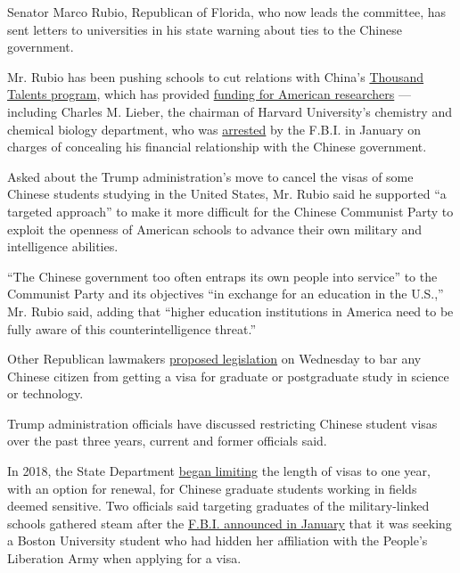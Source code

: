 Senator Marco Rubio, Republican of Florida, who now leads the committee,
has sent letters to universities in his state warning about ties to the
Chinese government.

Mr. Rubio has been pushing schools to cut relations with China's
\href{https://www.nytimes3xbfgragh.onion/2020/02/06/us/chinas-lavish-funds-lured-us-scientists-what-did-it-get-in-return.html}{Thousand
Talents program}, which has provided
\href{https://www.nytimes3xbfgragh.onion/2020/02/06/us/chinas-lavish-funds-lured-us-scientists-what-did-it-get-in-return.html}{funding
for American researchers} --- including Charles M. Lieber, the chairman
of Harvard University's chemistry and chemical biology department, who
was
\href{https://www.nytimes3xbfgragh.onion/2020/01/28/us/charles-lieber-harvard.html}{arrested}
by the F.B.I. in January on charges of concealing his financial
relationship with the Chinese government.

Asked about the Trump administration's move to cancel the visas of some
Chinese students studying in the United States, Mr. Rubio said he
supported ``a targeted approach'' to make it more difficult for the
Chinese Communist Party to exploit the openness of American schools to
advance their own military and intelligence abilities.

``The Chinese government too often entraps its own people into service''
to the Communist Party and its objectives ``in exchange for an education
in the U.S.,'' Mr. Rubio said, adding that ``higher education
institutions in America need to be fully aware of this
counterintelligence threat.''

Other Republican lawmakers
\href{https://www.cotton.senate.gov/?p=press_release\&id=1371}{proposed
legislation} on Wednesday to bar any Chinese citizen from getting a visa
for graduate or postgraduate study in science or technology.

Trump administration officials have discussed restricting Chinese
student visas over the past three years, current and former officials
said.

In 2018, the State Department
\href{https://www.nytimes3xbfgragh.onion/2018/07/25/us/politics/visa-restrictions-chinese-students.html}{began
limiting} the length of visas to one year, with an option for renewal,
for Chinese graduate students working in fields deemed sensitive. Two
officials said targeting graduates of the military-linked schools
gathered steam after the
\href{https://www.fbi.gov/wanted/counterintelligence/yanqing-ye}{F.B.I.
announced in January} that it was seeking a Boston University student
who had hidden her affiliation with the People's Liberation Army when
applying for a visa.

